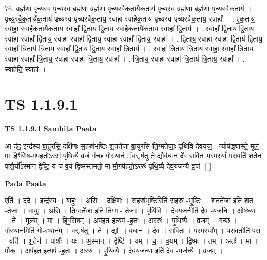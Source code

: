 \documentclass[17pt]{extarticle}
\begin{document}
76. ब्रह्म॑णा पृच्यस्व पृच्यस्व॒ ब्रह्म॑णा॒ ब्रह्म॑णा पृच्यस्वैक॒तायै॑क॒ताय॑ पृच्यस्व॒ ब्रह्म॑णा॒ ब्रह्म॑णा पृच्यस्वैक॒ताय॑ । . पृ॒च्य॒स्वै॒क॒तायै॑क॒ताय॑ पृच्यस्व पृच्यस्वैक॒ताय॒ स्वाहा॒ स्वाहै॑क॒ताय॑ पृच्यस्व पृच्यस्वैक॒ताय॒ स्वाहा᳚ । . ए॒क॒ताय॒ स्वाहा॒ स्वाहै॑क॒तायै॑क॒ताय॒ स्वाहा᳚ द्वि॒ताय॑ द्वि॒ताय॒ स्वाहै॑क॒तायै॑क॒ताय॒ स्वाहा᳚ द्वि॒ताय॑ । . स्वाहा᳚ द्वि॒ताय॑ द्वि॒ताय॒ स्वाहा॒ स्वाहा᳚ द्वि॒ताय॒ स्वाहा॒ स्वाहा᳚ द्वि॒ताय॒ स्वाहा॒ स्वाहा᳚ द्वि॒ताय॒ स्वाहा᳚ । . द्वि॒ताय॒ स्वाहा॒ स्वाहा᳚ द्वि॒ताय॑ द्वि॒ताय॒ स्वाहा᳚ त्रि॒ताय॑ त्रि॒ताय॒ स्वाहा᳚ द्वि॒ताय॑ द्वि॒ताय॒ स्वाहा᳚ त्रि॒ताय॑ । . स्वाहा᳚ त्रि॒ताय॑ त्रि॒ताय॒ स्वाहा॒ स्वाहा᳚ त्रि॒ताय॒ स्वाहा॒ स्वाहा᳚ त्रि॒ताय॒ स्वाहा॒ स्वाहा᳚ त्रि॒ताय॒ स्वाहा᳚ । . त्रि॒ताय॒ स्वाहा॒ स्वाहा᳚ त्रि॒ताय॑ त्रि॒ताय॒ स्वाहा᳚ । . स्वाहेति॒ स्वाहा᳚ । \newline
\pagebreak
{}
\section*{ TS 1.1.9.1 }

\textbf{TS 1.1.9.1 } \newline
\textbf{Samhita Paata} \newline

आ द॑द॒ इन्द्र॑स्य बा॒हुर॑सि॒ दक्षि॑णः स॒हस्र॑भृष्टिः श॒तते॑जा वा॒युर॑सि ति॒ग्मते॑जाः॒ पृथि॑वि देवयज॒ - न्योष॑द्ध्यास्ते॒ मूलं॒ मा हिꣳ॑सिष॒-मप॑हतो॒ऽररुः॑ पृथि॒व्यै व्र॒जं ग॑च्छ गो॒स्थानं॒ ॅवर्.ष॑तु ते॒ द्यौर्ब॑धा॒न दे॑व सवितः पर॒मस्यां᳚ परा॒वति॑ श॒तेन॒ पाशै॒र्यो᳚ऽस्मान् द्वेष्टि॒ यं च॑ व॒यं द्वि॒ष्मस्तमतो॒ मा मौ॒गप॑हतो॒ऽररुः॑ पृथि॒व्यै दे॑व॒यज॑न्यै व्र॒जं -[ ] \newline

\textbf{Pada Paata} \newline

एति॑ । द॒दे॒ । इन्द्र॑स्य । बा॒हुः । अ॒सि॒ । दक्षि॑णः । स॒हस्र॑भृष्टि॒रिति॑ स॒हस्र॑ -भृ॒ष्टिः॒ । श॒तते॑जा॒ इति॑ श॒त -ते॒जाः॒ । वा॒युः । अ॒सि॒ । ति॒ग्मते॑जा॒ इति॑ ति॒ग्म - ते॒जाः॒ । पृथि॑वि । दे॒व॒य॒ज॒नीति॑ देव -य॒ज॒नि॒ । ओष॑ध्याः । ते॒ । मूल᳚म् । मा । हिꣳ॒॒सि॒ष॒म् । अप॑हत॒ इत्यप॑ -ह॒तः॒ । अ॒ररुः॑ । पृ॒थि॒व्यै । व्र॒जम् । ग॒च्छ॒ । गो॒स्थान॒मिति॑ गो-स्थान᳚म् । वर्.ष॑तु । ते॒ । द्यौः । ब॒धा॒न । दे॒व॒ । स॒वि॒तः॒ । प॒र॒मस्या᳚म् । प॒रा॒वतीति॑ परा - वति॑ । श॒तेन॑ । पाशैः᳚ । यः । अ॒स्मान् । द्वेष्टि॑ । यम् । च॒ । व॒यम् । द्वि॒ष्मः । तम् । अतः॑ । मा । मौ॒क् । अप॑हत॒ इत्यप॑ -ह॒तः॒ । अ॒ररुः॑ । पृ॒थि॒व्यै । दे॒व॒यज॑न्या॒ इति॑ देव -यज॑न्यै । व्र॒जम् ।  \newline
\end{document}
